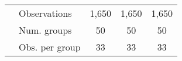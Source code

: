 \begin{tabular}{l|lccc}
& Observations & 1,650 & 1,650 & 1,650 \\ 

& Num. groups  & 50 & 50 & 50 \\ 

& Obs. per group  &33&33&33\\ 
\end{tabular} 
